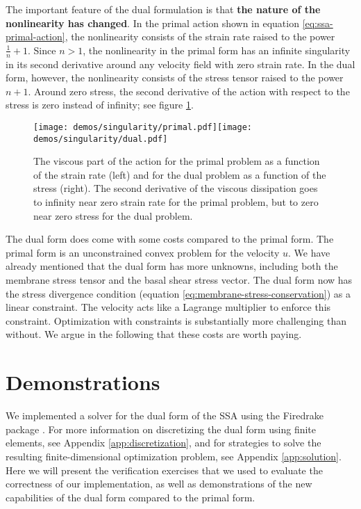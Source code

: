 \documentclass{article}
\theoremstyle{definition}
\theoremstyle{plain}
\begin{document}
The important feature of the dual formulation is that \textbf{the nature of the nonlinearity has changed}.
In the primal action shown in equation \eqref{eq:ssa-primal-action}, the nonlinearity consists of the strain rate raised to the power $\frac{1}{n} + 1$.
Since $n > 1$, the nonlinearity in the primal form has an infinite singularity in its second derivative around any velocity field with zero strain rate.
In the dual form, however, the nonlinearity consists of the stress tensor raised to the power $n + 1$.
Around zero stress, the second derivative of the action with respect to the stress is zero instead of infinity; see figure \ref{fig:primal-vs-dual}.

\begin{figure}[t]
    \texttt{[image: demos/singularity/primal.pdf]}\texttt{[image: demos/singularity/dual.pdf]}
    \caption{The viscous part of the action for the primal problem as a function of the strain rate (left) and for the dual problem as a function of the stress (right).
    The second derivative of the viscous dissipation goes to infinity near zero strain rate for the primal problem, but to zero near zero stress for the dual problem.}
    \label{fig:primal-vs-dual}
\end{figure}

The dual form does come with some costs compared to the primal form.
The primal form is an unconstrained convex problem for the velocity $u$.
We have already mentioned that the dual form has more unknowns, including both the membrane stress tensor and the basal shear stress vector.
The dual form now has the stress divergence condition (equation \eqref{eq:membrane-stress-conservation}) as a linear constraint.
The velocity acts like a Lagrange multiplier to enforce this constraint.
Optimization with constraints is substantially more challenging than without.
We argue in the following that these costs are worth paying.



\section{Demonstrations}

We implemented a solver for the dual form of the SSA using the Firedrake package \citep{FiredrakeUserManual}.
For more information on discretizing the dual form using finite elements, see Appendix \ref{app:discretization}, and for strategies to solve the resulting finite-dimensional optimization problem, see Appendix \ref{app:solution}.
Here we will present the verification exercises that we used to evaluate the correctness of our implementation, as well as demonstrations of the new capabilities of the dual form compared to the primal form.
\end{document}
